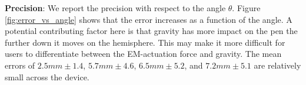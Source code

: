 \noindent\textbf{Precision}: We report the precision with respect to the angle $\theta$. Figure \ref{fig:error_vs_angle} shows that the error increases as a function of the angle. A potential contributing factor here is that gravity has more impact on the pen the further down it moves on the hemisphere. This may make it more difficult for users to differentiate between the EM-actuation force and gravity. The mean errors of $2.5 mm \pm 1.4$, $5.7 mm \pm 4.6$, $6.5 mm \pm 5.2$, and $7.2 mm \pm 5.1$ are relatively small across the device.